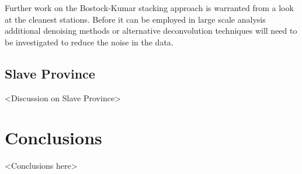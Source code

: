 \documentclass[draft, 12pt]{article}
\begin{document}
  Further work on the Bostock-Kumar stacking approach is warranted from a look at the cleanest stations. Before it can be employed in large scale analysis additional denoising methods or alternative deconvolution techniques will need to be investigated to reduce the noise in the data.


\subsection{Slave Province}
<Discussion on Slave Province>

\section{Conclusions}
<Conclusions here>




\begin{thebibliography}{}


\end{thebibliography}





%

\end{document}
